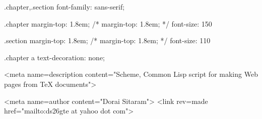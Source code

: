 .chapter,.section {
font-family: sans-serif;
}

.chapter {
margin-top: 1.8em;
/* margin-top: 1.8em; */
font-size: 150%
}

.section {
 margin-top: 1.8em;
/* margin-top: 1.8em; */
font-size: 110%
}

.chapter a {
text-decoration: none;
}
\endcssblock

\slatexlikecomments


\imgpreamble
  \magnification{}
\endimgpreamble

\ifx{}
\else
{}
\fi


\htmlheadonly
<meta name=description content="Scheme, Common Lisp script for making Web pages
from TeX documents">

<meta name=author content="Dorai Sitaram">
<link rev=made href="mailto:ds26gte at yahoo dot com">

\endhtmlheadonly

\ifx{}
\def\spaceifnotempty{\eval{
(let ((x (ungroup (get-token))))
  (unless (all-blanks? x)
    (princ (code-char 92))
    (princ "space")))}}
\else
\def\spaceifnotempty{\eval{
(let ((x (ungroup (get-token))))
  (if (not (all-blanks? x))
      (begin (display (integer->char 92))
             (display "space"))
      0))
}}
\fi
